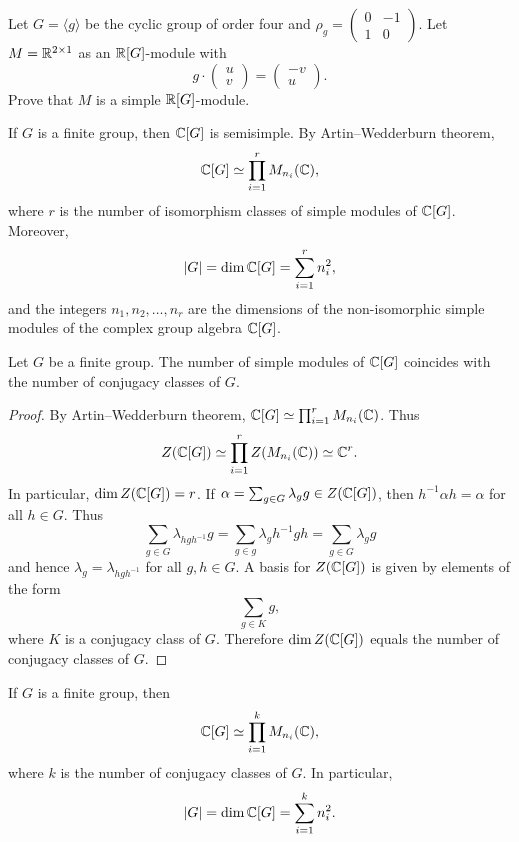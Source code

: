 \begin{exercise}
Let $G=\langle g\rangle$ be the cyclic group 
of order four and $\rho_g=\begin{pmatrix}
0&-1\\
1&0\end{pmatrix}$. 
Let $M=\mathbb{R}^{2\times 1}$ as an $\mathbb{R}[G]$-module with 
\[
g\cdot\begin{pmatrix}u\\v\end{pmatrix}
=\begin{pmatrix}-v\\u\end{pmatrix}.
\]
Prove that $M$ is a simple $\mathbb{R}[G]$-module. 
\end{exercise}

If $G$ is a finite group, 
then $\mathbb{C}[G]$ is semisimple. By Artin--Wedderburn theorem, 
\[
\mathbb{C}[G]\simeq\prod_{i=1}^r M_{n_i}(\mathbb{C}),
\]
where $r$ is the number of isomorphism classes of simple modules of $\mathbb{C}[G]$. Moreover, 
\[
|G|=\dim\mathbb{C}[G]=\sum_{i=1}^r n_i^2,
\]
and the integers 
$n_1,n_2,\dots,n_r$ are
the dimensions of the non-isomorphic simple modules of
the complex group algebra 
$\mathbb{C}[G]$. 

\begin{theorem}
    Let $G$ be a finite group. The number of simple 
    modules of $\mathbb{C}[G]$ coincides with the number of conjugacy classes of $G$. 
\end{theorem}

\begin{proof}
    By Artin--Wedderburn theorem, $\mathbb{C}[G]\simeq\prod_{i=1}^rM_{n_i}(\mathbb{C})$. Thus 
    \[
		Z(\mathbb{C}[G])\simeq\prod_{i=1}^rZ(M_{n_i}(\mathbb{C}))\simeq\mathbb{C}^r.
	\]
	In particular, $\dim Z(\mathbb{C}[G])=r$. If $\alpha=\sum_{g\in
	G}\lambda_gg\in Z(\mathbb{C}[G])$, then $h^{-1}\alpha h=\alpha$ for all $h\in
	G$. Thus 
	\[
		\sum_{g\in G}\lambda_{hgh^{-1}}g=
		\sum_{g\in g}\lambda_g h^{-1}gh=\sum_{g\in G}\lambda_gg
	\]
	and hence $\lambda_{g}=\lambda_{hgh^{-1}}$ for all $g,h\in G$. A basis for 
	$Z(\mathbb{C}[G])$ is given by elements of the form 
	\[
		\sum_{g\in K}g,
	\]
	where $K$ is a conjugacy class of $G$. Therefore $\dim Z(\mathbb{C}[G])$ equals 
	the number of conjugacy classes of $G$.
\end{proof}

If $G$ is a finite group,
then 
\[
\mathbb{C}[G]\simeq \prod_{i=1}^k M_{n_i}(\mathbb{C}),
\]
where $k$ is the number of conjugacy classes of $G$. 
In particular, 
\[
|G|=\dim\mathbb{C}[G]=\sum_{i=1}^k n_i^2.
\]


